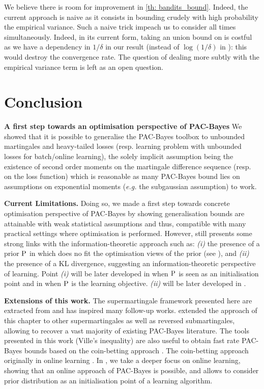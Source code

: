 We believe there is room for improvement in \cref{th: bandits_bound}. Indeed, the current approach is naive as it consists in bounding crudely with high probability the empirical variance. Such a naive trick impeach us to consider all times simultaneously. Indeed, in its current form, taking an union bound on  is costful as we have a dependency in $1/\delta$ in our result (instead of $\log(1/\delta)$ in \citealp{seldin2012bandit}): this would destroy the convergence rate. The question of dealing more subtly with the empirical variance term is left as an open question.

\section{Conclusion}

\textbf{A first step towards an optimisation perspective of PAC-Bayes} We showed that it is possible to generalise the PAC-Bayes toolbox to unbounded martingales and heavy-tailed losses (resp. learning problem with unbounded losses for batch/online learning), the solely implicit assumption being the existence of second order moments on the martingale difference sequence (resp. on the loss function) which is reasonable as many PAC-Bayes bound lies on assumptions on exponential moments (\emph{e.g.} the subgaussian assumption) to work.

\textbf{Current Limitations.} Doing so, we made a first step towards concrete optimisation perspective of PAC-Bayes by showing generalisation bounds are attainable with weak statistical assumptions and thus, compatible with many practical settings where optimisation is performed. However,  still presents some strong links with the information-theoretic approach such as: \textit{(i)} the presence of a prior $\P$ in  which does no fit the optimisation views of the prior (see ), and \textit{(ii)} the presence of a KL divergence, suggesting an information-theoretic perspective of learning. Point \textit{(i)} will be later developed in  when $\P$ is seen as an initialisation point and in  when $\P$ is the learning objective. \textit{(ii)} will be later developed in . 

\textbf{Extensions of this work.} The supermartingale framework presented here are extracted from \citet{haddouche2023pac} and has inspired many follow-up works. \citet{chugg2023unified} extended the approach of this chapter to other supermartingales as well as reversed submartingales, allowing to recover a vast majority of existing PAC-Bayes literature. The tools presented in this work (\eg Ville's inequality) are also useful to obtain fast rate PAC-Bayes bounds based on the coin-betting approach \citet{jang2023tight,kuzborskij2024better}. The coin-betting approach originally in online learning \citep{orabona2016coin}. In , we take a deeper focus on online learning, showing that an online approach of PAC-Bayes is possible, and allows to consider prior distribution as an initialisation point of a learning algorithm.

